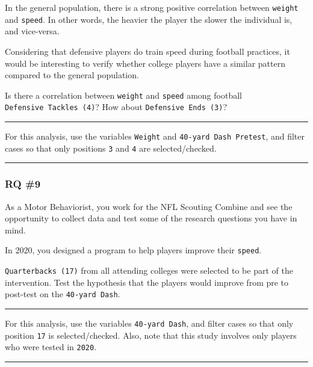 \documentclass[
]{article}
\begin{document}
In the general population, there is a strong positive correlation between \texttt{weight} and \texttt{speed}. In other words, the heavier the player the slower the individual is, and vice-versa.

Considering that defensive players do train speed during football practices, it would be interesting to verify whether college players have a similar pattern compared to the general population.

Is there a correlation between \texttt{weight} and \texttt{speed} among football \texttt{Defensive\ Tackles\ (4)}? How about \texttt{Defensive\ Ends\ (3)}?

\begin{center}\rule{0.5\linewidth}{0.5pt}\end{center}

For this analysis, use the variables \texttt{Weight} and \texttt{40-yard\ Dash\ Pretest}, and filter cases so that only positions \texttt{3} and \texttt{4} are selected/checked.

\begin{center}\rule{0.5\linewidth}{0.5pt}\end{center}

\hypertarget{rq-9}{%
\subsubsection{RQ \#9}\label{rq-9}}

As a Motor Behaviorist, you work for the NFL Scouting Combine and see the opportunity to collect data and test some of the research questions you have in mind.

In 2020, you designed a program to help players improve their \texttt{speed}.

\texttt{Quarterbacks\ (17)} from all attending colleges were selected to be part of the intervention. Test the hypothesis that the players would improve from pre to post-test on the \texttt{40-yard\ Dash}.

\begin{center}\rule{0.5\linewidth}{0.5pt}\end{center}

For this analysis, use the variables \texttt{40-yard\ Dash}, and filter cases so that only position \texttt{17} is selected/checked. Also, note that this study involves only players who were tested in \texttt{2020}.

\begin{center}\rule{0.5\linewidth}{0.5pt}\end{center}
\end{document}
